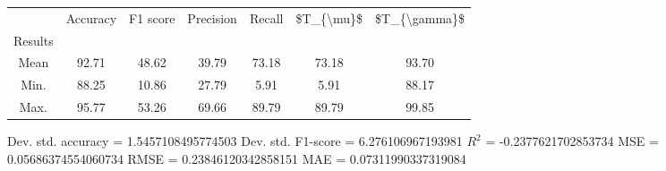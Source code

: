 \begin{tabular}{|c|c|c|c|c|c|c|}
\toprule
{} &  Accuracy &  F1 score &  Precision &  Recall &  \$T\_\{\textbackslash mu\}\$ &  \$T\_\{\textbackslash gamma\}\$ \\
Results &           &           &            &         &            &               \\
\hline
Mean    &     92.71 &     48.62 &      39.79 &   73.18 &      73.18 &         93.70 \\
Min.    &     88.25 &     10.86 &      27.79 &    5.91 &       5.91 &         88.17 \\
Max.    &     95.77 &     53.26 &      69.66 &   89.79 &      89.79 &         99.85 \\
\bottomrule
\end{tabular}

 Dev. std. accuracy = 1.5457108495774503
 Dev. std. F1-score = 6.276106967193981
 $R^2$ = -0.2377621702853734
 MSE = 0.05686374554060734
 RMSE = 0.23846120342858151
 MAE = 0.07311990337319084